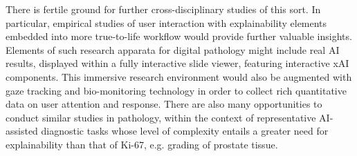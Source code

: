 



  


There is fertile ground for further cross-disciplinary studies of this sort. In particular, empirical studies of user interaction with explainability elements embedded into more true-to-life workflow would provide further valuable insights. Elements of such research apparata for digital pathology might include real AI results, displayed within a fully interactive slide viewer, featuring interactive xAI components. This immersive research environment would also be augmented with gaze tracking and bio-monitoring technology in order to collect rich quantitative data on user attention and response. There are also many opportunities to conduct similar studies in pathology, within the context of representative AI-assisted diagnostic tasks whose level of complexity entails a greater need for explainability than that of Ki-67, e.g. grading of prostate tissue.

